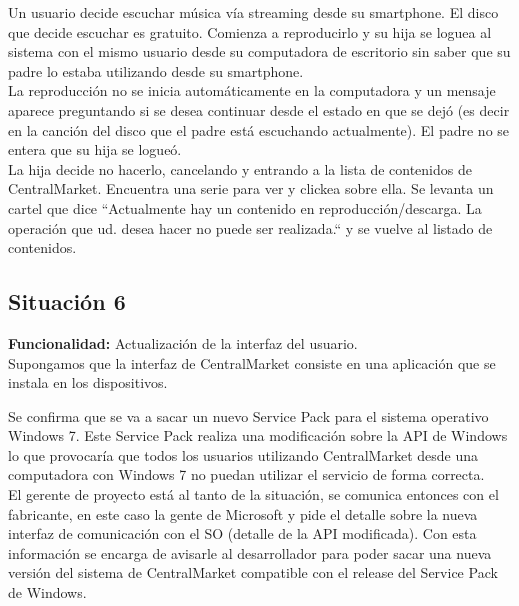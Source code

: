 \documentclass[11pt, a4paper, spanish]{article}
\begin{document}
      Un usuario decide escuchar m\'usica v\'ia streaming desde su smartphone. El disco que decide escuchar es gratuito. Comienza a reproducirlo y su hija 
   se loguea al sistema con el mismo usuario desde su computadora de escritorio sin saber que su padre lo estaba utilizando desde su smartphone.\\

      La reproducci\'on no se inicia autom\'aticamente en la computadora y un mensaje aparece preguntando si se desea continuar desde el estado en que se   
   dej\'o (es decir en la canci\'on del disco que el padre est\'a escuchando actualmente). El padre no se entera que su hija se logue\'o.\\

      La hija decide no hacerlo, cancelando y entrando a la lista de contenidos de CentralMarket. Encuentra una serie para ver y clickea sobre ella. Se 
   levanta un cartel que dice ``Actualmente hay un contenido en reproducci\'on/descarga. La operaci\'on que ud. desea hacer no puede ser realizada.`` 	  y se vuelve al listado de contenidos.

\subsection{Situaci\'on 6}

	\textbf{Funcionalidad:} Actualizaci\'on de la interfaz del usuario.\\

	Supongamos que la interfaz de CentralMarket consiste en una aplicaci\'on que se instala en los dispositivos.

	Se confirma que se va a sacar un nuevo Service Pack para el sistema operativo Windows 7. Este Service Pack realiza una modificaci\'on sobre la   
   API de Windows lo que provocar\'ia que todos los usuarios utilizando CentralMarket desde una computadora con Windows 7 no puedan utilizar el servicio 
   de forma correcta.\\

       El gerente de proyecto est\'a al tanto de la situaci\'on, se comunica entonces con el fabricante, en este caso la gente de Microsoft y pide el    
   detalle sobre la nueva interfaz de comunicaci\'on con el SO (detalle de la API modificada). Con esta informaci\'on se encarga de avisarle al 
   desarrollador para poder sacar una nueva versi\'on del sistema de CentralMarket compatible con el release del Service Pack de Windows.

\newpage
\end{document}
